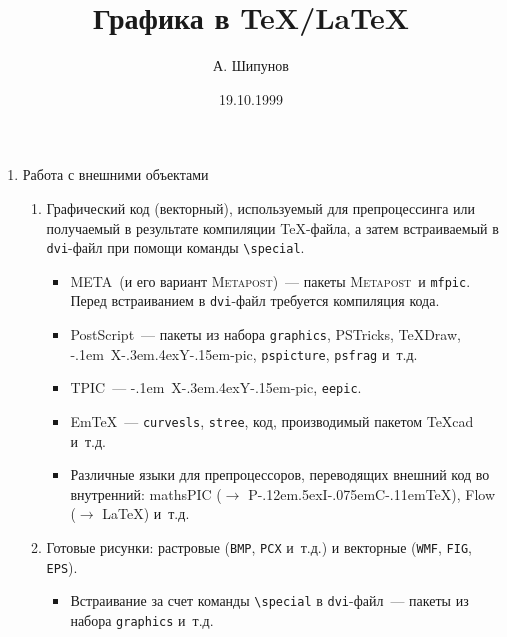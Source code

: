 \documentclass[a4paper,12pt]{article}
\author{А. Шипунов}
\title{Графика в \TeX/\LaTeX}
\date{19.10.1999}
\def\PiCTeX{{\rm P\kern-.12em\lower.5ex\hbox{I}\kern-.075emC\kern-.11em\TeX}}
\def\MF{{\manual META}\-{\manual FONT}}
\def\MP{{\scshape Meta\-post}}
\def\Xy{\leavevmode\hbox{\kern-.1em X\kern-.3em\lower.4ex\hbox{Y\kern-.15em}}}
\begin{document}
\maketitle

\begin{enumerate}

\item Работа с внешними объектами

        \begin{enumerate}

        \item Графический код (\<векторный\>), используемый для
        препроцессинга или получаемый в результате компиляции
        \TeX-файла, а затем встраиваемый в \texttt{dvi}-файл при
        помощи команды \verb|\special|.

                \begin{itemize}

                \item \MF\ (и его вариант \MP)~--- пакеты \MP\ и
                \texttt{mfpic}. Перед встраиванием в \texttt{dvi}-файл
                требуется компиляция кода.

                \item PostScript~--- пакеты из набора
                \<\texttt{graphics}\>, PSTricks, \TeX{}\-Draw,
                \Xy-pic, \texttt{pspicture}, \texttt{psfrag} и~т.д.

                \item TPIC~--- \Xy-pic, \texttt{eepic}.

                \item Em\TeX~--- \texttt{curvesls}, \texttt{stree}, код,
                производимый пакетом \TeX{}cad и~т.д.

                \item Различные языки для препроцессоров,
                переводящих внешний код во внутренний: mathsPIC
                ($\rightarrow$ \PiCTeX), Flow ($\rightarrow$
                \LaTeX) и~т.д.

                \end{itemize}

        \item Готовые рисунки: растровые (\texttt{BMP}, \texttt{PCX} и~т.д.)
        и векторные (\texttt{WMF}, \texttt{FIG}, \texttt{EPS}).

                \begin{itemize}

                \item Встраивание за счет команды
                \verb|\special| в \texttt{dvi}-файл~--- пакеты из
                набора \<\texttt{graphics}\> и~т.д.


\end{itemize}
\end{enumerate}
\end{enumerate}
\end{document}
